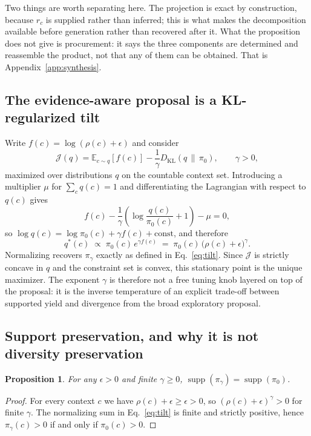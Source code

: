 \documentclass{article}
\newtheorem{proposition}{Proposition}
\begin{document}
Two things are worth separating here. The projection is exact by construction, because $r_c$ is
supplied rather than inferred; this is what makes the decomposition available before generation
rather than recovered after it. What the proposition does not give is procurement: it says the three
components are determined and reassemble the product, not that any of them can be obtained. That is
Appendix~\ref{app:synthesis}.

\subsection{The evidence-aware proposal is a KL-regularized tilt}
\label{app:kl-derivation}
Write $f(c) = \log(\rho(c) + \epsilon)$ and consider
%
\[
\mathcal{J}(q) = \mathbb{E}_{c \sim q}\!\left[ f(c) \right]
- \frac{1}{\gamma} D_{\mathrm{KL}}\!\left( q \,\|\, \pi_0 \right),
\qquad \gamma > 0,
\]
%
maximized over distributions $q$ on the countable context set. Introducing a multiplier $\mu$ for
$\sum_c q(c) = 1$ and differentiating the Lagrangian with respect to $q(c)$ gives
%
\[
f(c) - \frac{1}{\gamma}\left( \log \frac{q(c)}{\pi_0(c)} + 1 \right) - \mu = 0,
\]
%
so $\log q(c) = \log \pi_0(c) + \gamma f(c) + \text{const}$, and therefore
%
\[
q^{*}(c) \;\propto\; \pi_0(c)\, e^{\gamma f(c)} \;=\; \pi_0(c)\, \bigl(\rho(c) + \epsilon\bigr)^{\gamma}.
\]
%
Normalizing recovers $\pi_\gamma$ exactly as defined in Eq.~\eqref{eq:tilt}. Since $\mathcal{J}$ is
strictly concave in $q$ and the constraint set is convex, this stationary point is the unique
maximizer. The exponent $\gamma$ is therefore not a free tuning knob layered on top of the
proposal: it is the inverse temperature of an explicit trade-off between supported yield and
divergence from the broad exploratory proposal.

\subsection{Support preservation, and why it is not diversity preservation}
\label{app:support-preservation}
\begin{proposition}
\label{prop:support}
For any $\epsilon > 0$ and finite $\gamma \geq 0$,
$\operatorname{supp}(\pi_\gamma) = \operatorname{supp}(\pi_0)$.
\end{proposition}

\begin{proof}
For every context $c$ we have $\rho(c) + \epsilon \geq \epsilon > 0$, so
$(\rho(c) + \epsilon)^{\gamma} > 0$ for finite $\gamma$. The normalizing sum in Eq.~\eqref{eq:tilt}
is finite and strictly positive, hence $\pi_\gamma(c) > 0$ if and only if $\pi_0(c) > 0$.
\end{proof}
\end{document}
